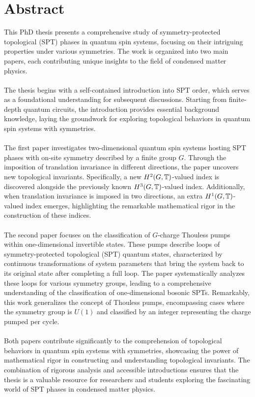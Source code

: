 \chapter{Abstract}                                 \label{ch:abstract}

This PhD thesis presents a comprehensive study of symmetry-protected topological (SPT) phases in quantum spin systems, focusing on their intriguing properties under various symmetries. The work is organized into two main papers, each contributing unique insights to the field of condensed matter physics.
\\\\
The thesis begins with a self-contained introduction into SPT order, which serves as a foundational understanding for subsequent discussions. Starting from finite-depth quantum circuits, the introduction provides essential background knowledge, laying the groundwork for exploring topological behaviors in quantum spin systems with symmetries.
\\\\
The first paper investigates two-dimensional quantum spin systems hosting SPT phases with on-site symmetry described by a finite group $G$. Through the imposition of translation invariance in different directions, the paper uncovers new topological invariants. Specifically, a new $H^2(G,\mathbb T)$-valued index is discovered alongside the previously known $H^3(G,\mathbb T)$-valued index. Additionally, when translation invariance is imposed in two directions, an extra $H^1(G,\mathbb T)$-valued index emerges, highlighting the remarkable mathematical rigor in the construction of these indices.
\\\\
The second paper focuses on the classification of $G$-charge Thouless pumps within one-dimensional invertible states. These pumps describe loops of symmetry-protected topological (SPT) quantum states, characterized by continuous transformations of system parameters that bring the system back to its original state after completing a full loop. The paper systematically analyzes these loops for various symmetry groups, leading to a comprehensive understanding of the classification of one-dimensional bosonic SPTs. Remarkably, this work generalizes the concept of Thouless pumps, encompassing cases where the symmetry group is $U(1)$ and classified by an integer representing the charge pumped per cycle.
\\\\
Both papers contribute significantly to the comprehension of topological behaviors in quantum spin systems with symmetries, showcasing the power of mathematical rigor in constructing and understanding topological invariants. The combination of rigorous analysis and accessible introductions ensures that the thesis is a valuable resource for researchers and students exploring the fascinating world of SPT phases in condensed matter physics.




\cleardoublepage

